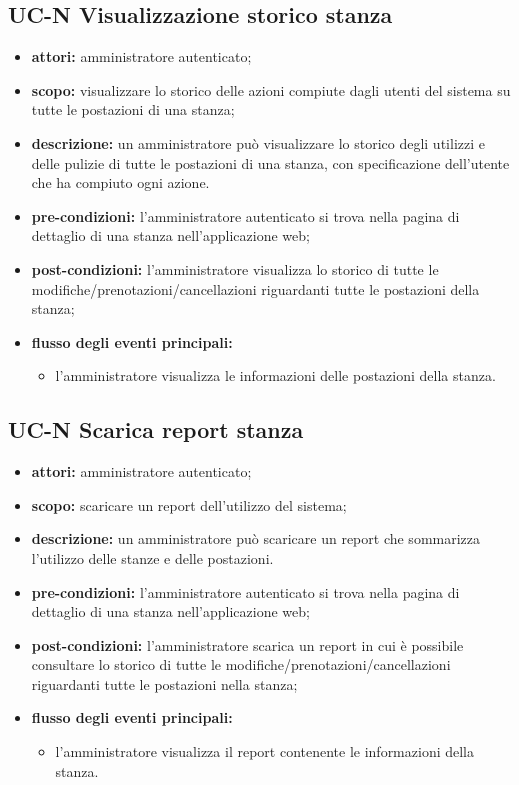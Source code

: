 \subsection{UC-N Visualizzazione storico stanza}
\begin{itemize}
    \item \textbf{attori:} amministratore autenticato;
    \item \textbf{scopo:} visualizzare lo storico delle azioni compiute dagli utenti del sistema su tutte le postazioni di una stanza;
    \item \textbf{descrizione:} un amministratore pu\`{o} visualizzare lo storico degli utilizzi e delle pulizie di tutte le postazioni di una stanza, con specificazione dell'utente che ha compiuto ogni azione.
    \item \textbf{pre-condizioni:} l'amministratore autenticato si trova nella pagina di dettaglio di una stanza nell'applicazione web;
    \item \textbf{post-condizioni:} l'amministratore visualizza lo storico di tutte le modifiche/prenotazioni/cancellazioni riguardanti tutte le postazioni della stanza;
    \item \textbf{flusso degli eventi principali:}
    \begin{itemize}
        \item l'amministratore visualizza le informazioni delle postazioni della stanza.
    \end{itemize}
\end{itemize}



\subsection{UC-N Scarica report stanza}
\begin{itemize}
    \item \textbf{attori:} amministratore autenticato;
    \item \textbf{scopo:} scaricare un report dell'utilizzo del sistema;
    \item \textbf{descrizione:} un amministratore pu\`{o} scaricare un report che sommarizza l'utilizzo delle stanze e delle postazioni.
    \item \textbf{pre-condizioni:} l'amministratore autenticato si trova nella pagina di dettaglio di una stanza nell'applicazione web;
    \item \textbf{post-condizioni:} l'amministratore scarica un report in cui \`{e} possibile consultare lo storico di tutte le modifiche/prenotazioni/cancellazioni riguardanti tutte le postazioni nella stanza;
    \item \textbf{flusso degli eventi principali:}
    \begin{itemize}
        \item l'amministratore visualizza il report contenente le informazioni della stanza.
    \end{itemize}
\end{itemize}